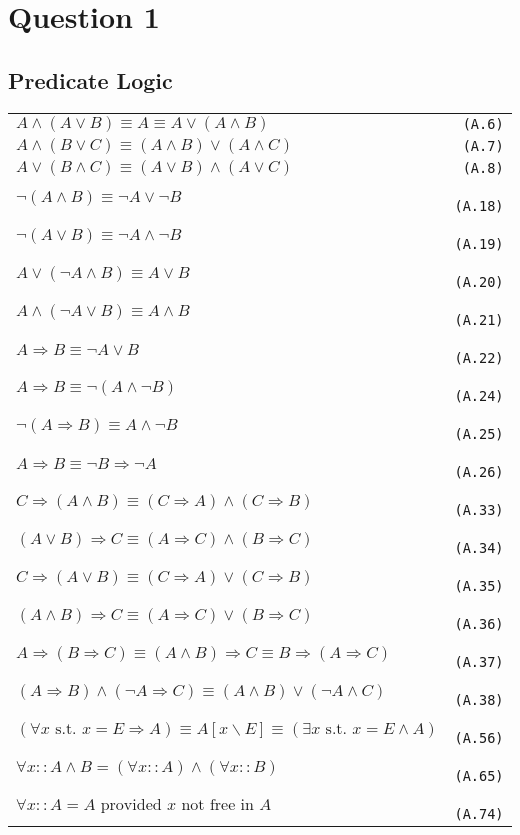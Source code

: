 \section{Question 1}

\subsection{Predicate Logic}

\begin{tabular}{@{}ll@{}}
$ A \land (A \lor B) \equiv A \equiv A \lor (A \land B)$ & \verb! (A.6)! \\
$ A \land (B \lor C) \equiv (A \land B) \lor (A \land C)$ & \verb! (A.7)! \\
$ A \lor (B \land C) \equiv (A \lor B) \land (A \lor C)$ & \verb! (A.8)! \\
$ \neg (A \land B) \equiv \neg A \lor \neg B$ & \verb! (A.18)! \\
$ \neg (A \lor B) \equiv \neg A \land \neg B$ & \verb! (A.19)! \\
$ A \lor (\neg A \land B) \equiv A \lor B$ & \verb! (A.20)! \\
$ A \land (\neg A \lor B) \equiv A \land B$ & \verb! (A.21)! \\
$ A \Rightarrow B \equiv \neg A \lor B$ & \verb! (A.22)! \\
$ A \Rightarrow B \equiv \neg(A \land \neg B)$ & \verb! (A.24)! \\
$ \neg(A \Rightarrow B) \equiv A \land \neg B$ & \verb! (A.25)! \\
$ A \Rightarrow B \equiv \neg B \Rightarrow \neg A$ & \verb! (A.26)! \\
$ C \Rightarrow (A \land B) \equiv (C \Rightarrow A) \land (C \Rightarrow B)$ & \verb! (A.33)! \\
$ (A \lor B) \Rightarrow C \equiv (A \Rightarrow C) \land (B \Rightarrow C)$ & \verb! (A.34)! \\
$ C \Rightarrow (A \lor B) \equiv (C \Rightarrow A) \lor (C \Rightarrow B)$ & \verb! (A.35)! \\
$ (A \land B) \Rightarrow C \equiv (A \Rightarrow C) \lor (B \Rightarrow C)$ & \verb! (A.36)! \\
$ A \Rightarrow (B \Rightarrow C) \equiv (A \land B) \Rightarrow C \equiv B \Rightarrow (A \Rightarrow C)$ & \verb! (A.37)! \\
$ (A \Rightarrow B) \land (\neg A \Rightarrow C) \equiv (A \land B) \lor (\neg A \land C)$ & \verb! (A.38)! \\
$ (\forall x \text{ s.t. } x = E \Rightarrow A) \equiv A[x \backslash E] \equiv (\exists x \text{ s.t. } x = E \land A)$ & \verb! (A.56)! \\
$ \forall x :: A \land B = (\forall x :: A) \land (\forall x :: B)$ & \verb! (A.65)! \\
$ \forall x :: A = A \text{ provided } x \text{ not free in } A$ & \verb! (A.74)! \\
\end{tabular}


